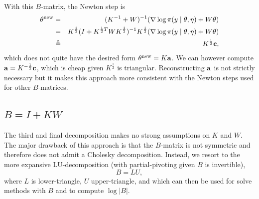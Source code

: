\documentclass[stslayout, noinfoline]{imsart}
\theoremstyle{definition}
\begin{document}
With this $B$-matrix, the Newton step is
\begin{eqnarray*}
  \theta^\text{new} & = & (K^{-1} + W)^{-1} (\nabla \log \pi(y \mid \theta, \eta) + W \theta) \\
    & = & K^\frac{1}{2} (I + K^{\frac{1}{2} T} W K^\frac{1}{2} )^{-1} K^\frac{1}{2} (\nabla \log \pi(y \mid \theta, \eta) + W \theta) \\
    & \triangleq & K^\frac{1}{2} {\bf c},
\end{eqnarray*}
%
which does not quite have the desired form $\theta^\text{new} = K {\bf a}$.
We can however compute ${\bf a} = K^{-\frac{1}{2}} {\bf c}$, which is cheap given $K^\frac{1}{2}$ is triangular.
Reconstructing $\bf a$ is not strictly necessary but it makes this approach more consistent with the Newton steps used for other $B$-matrices.

\subsection{$B = I + KW$}

The third and final decomposition makes no strong assumptions on $K$ and $W$.
The major drawback of this approach is that the $B$-matrix is not symmetric and therefore does not admit a Cholesky decomposition.
Instead, we resort to the more expansive LU-decomposition (with partial-pivoting given $B$ is invertible),
\begin{equation*}
  B = LU,
\end{equation*}
where $L$ is lower-triangle, $U$ upper-triangle, and which can then be used for solve methods with $B$
and to compute $\log |B|$.
\end{document}
